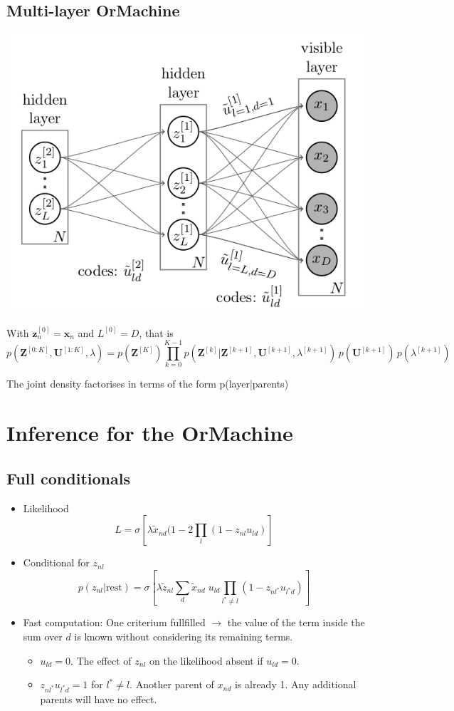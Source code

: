 \documentclass[11pt]{article}
\begin{document}
\subsection*{Multi-layer OrMachine}
\label{sec-2-2}
\includegraphics[width=.9\linewidth]{./twolayer_hm.png}

With ${\mathbf{z}^{[0]}_n = \mathbf{x}_n}$ and ${L^{[0]} = D}$, that is
$$  p(\mathbf{Z}^{[0:K]},\mathbf{U}^{[1:K]},\lambda) = 
  p(\mathbf{Z}^{[K]}) \prod_{k=0}^{K-1} p(\mathbf{Z}^{[k]}|\mathbf{Z}^{[k{+}1]},\mathbf{U}^{[k{+}1]},\lambda^{[k{+}1]})\, p(\mathbf{U}^{[k{+}1]})\, p(\lambda^{[k{+}1]}) 
$$

The joint density factorises in terms of the form p(layer|parents)

\section*{Inference for the OrMachine}
\label{sec-3}
\subsection*{Full conditionals}
\label{sec-3-1}
\begin{itemize}
\item Likelihood $$L = \sigma\left[\lambda \tilde{x}_{nd} (1-2\prod\limits_{l}(1-z_{nl}u_{ld}) \right]$$
\item Conditional for $z_{nl}$ $$ p(z_{nl}|\text{rest}) = \sigma\left[\lambda \tilde{z}_{nl} \sum\limits_d \tilde{x}_{nd}\; u_{ld}\prod\limits_{l^*\neq l} (1-z_{nl^*}u_{l^*d})\right] $$
\item Fast computation: One criterium fullfilled $\rightarrow$ the value of the term inside the sum over $d$ is known without considering its remaining terms.
\begin{itemize}
\item $u_{ld} = 0$. The effect of $z_{nl}$ on the likelihood  absent if $u_{ld}=0$.
\item $z_{nl^*}u_{l^*d} = 1$ for $l^* \neq l$. Another parent of $x_{nd}$ is already 1. Any additional parents will have no effect.
\end{itemize}
\end{itemize}
\end{document}
